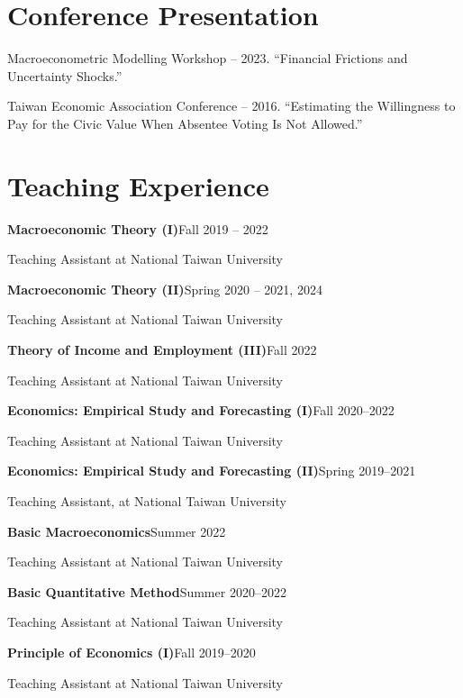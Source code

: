 \documentclass{article}
\newcommand{\cvsection}[1]{\section*{\rmfamily#1}}
\begin{document}
\begin{enumerate}[resume]
\begin{itemize}
    \end{itemize}
\end{enumerate}



\cvsection{Conference Presentation}
\indent 

Macroeconometric Modelling Workshop -- 2023. “Financial Frictions and Uncertainty Shocks.”

Taiwan Economic Association Conference -- 2016. “Estimating the Willingness to Pay for the Civic Value When Absentee Voting Is Not Allowed.”



\cvsection{Teaching Experience}
\indent

\textbf{Macroeconomic Theory (I)}\hfill Fall 2019 -- 2022

\hspace{2em}Teaching Assistant at National Taiwan University

\textbf{Macroeconomic Theory (II)}\hfill Spring 2020 -- 2021, 2024

\hspace{2em}Teaching Assistant at National Taiwan University

\textbf{Theory of Income and Employment (III)}\hfill Fall 2022

\hspace{2em}Teaching Assistant at National Taiwan University

\textbf{Economics: Empirical Study and Forecasting (I)}\hfill Fall 2020--2022

\hspace{2em}Teaching Assistant at National Taiwan University

\textbf{Economics: Empirical Study and Forecasting (II)}\hfill Spring 2019--2021

\hspace{2em}Teaching Assistant, at National Taiwan University

\textbf{Basic Macroeconomics}\hfill Summer 2022

\hspace{2em}Teaching Assistant at National Taiwan University

\textbf{Basic Quantitative Method}\hfill Summer 2020--2022

\hspace{2em}Teaching Assistant at National Taiwan University

\textbf{Principle of Economics (I)}\hfill Fall 2019--2020

\hspace{2em}Teaching Assistant at National Taiwan University
\end{document}
